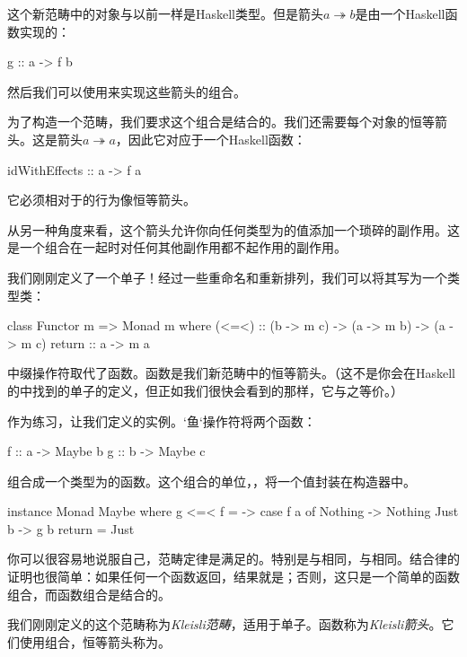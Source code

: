 \documentclass[DaoFP]{subfiles}
\begin{document}
    这个新范畴中的对象与以前一样是Haskell类型。但是箭头$a \twoheadrightarrow b$是由一个Haskell函数实现的：
    \begin{haskell}
        g :: a -> f b
    \end{haskell}
    然后我们可以使用来实现这些箭头的组合。

    为了构造一个范畴，我们要求这个组合是结合的。我们还需要每个对象的恒等箭头。这是箭头$a \twoheadrightarrow a$，因此它对应于一个Haskell函数：
    \begin{haskell}
        idWithEffects :: a -> f a
    \end{haskell}
    它必须相对于的行为像恒等箭头。

    从另一种角度来看，这个箭头允许你向任何类型为的值添加一个琐碎的副作用。这是一个组合在一起时对任何其他副作用都不起作用的副作用。

    我们刚刚定义了一个单子！经过一些重命名和重新排列，我们可以将其写为一个类型类：
    \begin{haskell}
        class Functor m => Monad m where
        (<=<) :: (b -> m c) -> (a -> m b) -> (a -> m c)
        return :: a -> m a
    \end{haskell}
    中缀操作符\hask{<=<}取代了函数。函数是我们新范畴中的恒等箭头。（这不是你会在Haskell的中找到的单子的定义，但正如我们很快会看到的那样，它与之等价。）

    作为练习，让我们定义的实例。`鱼`操作符\hask{<=<}将两个函数：
    \begin{haskell}
        f :: a -> Maybe b
        g :: b -> Maybe c
    \end{haskell}
    组合成一个类型为的函数。这个组合的单位，，将一个值封装在构造器中。
    \begin{haskell}
        instance Monad Maybe where
        g <=< f = \a -> case f a of
        Nothing -> Nothing
        Just b -> g b
        return = Just
    \end{haskell}

    你可以很容易地说服自己，范畴定律是满足的。特别是与相同，与相同。结合律的证明也很简单：如果任何一个函数返回，结果就是；否则，这只是一个简单的函数组合，而函数组合是结合的。

    我们刚刚定义的这个范畴称为\emph{Kleisli范畴}，适用于单子。函数称为\emph{Kleisli箭头}。它们使用\hask{<=<}组合，恒等箭头称为。
\end{document}
